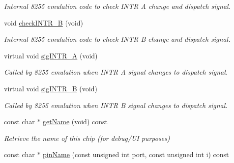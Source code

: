 \begin{DoxyCompactItemize}
\begin{DoxyCompactList}\small\item\em Internal 8255 emulation code to check I\-N\-T\-R A change and dispatch signal. \end{DoxyCompactList}\item 
\hypertarget{classIntel8255_aa1fb90bb0a5ecf6121e8f79eb7b757d8}{void \hyperlink{classIntel8255_aa1fb90bb0a5ecf6121e8f79eb7b757d8}{check\-I\-N\-T\-R\-\_\-\-B} (void)}\label{classIntel8255_aa1fb90bb0a5ecf6121e8f79eb7b757d8}

\begin{DoxyCompactList}\small\item\em Internal 8255 emulation code to check I\-N\-T\-R B change and dispatch signal. \end{DoxyCompactList}\item 
\hypertarget{classIntel8255_a2338b0324884d4362c516631dd838466}{virtual void \hyperlink{classIntel8255_a2338b0324884d4362c516631dd838466}{sig\-I\-N\-T\-R\-\_\-\-A} (void)}\label{classIntel8255_a2338b0324884d4362c516631dd838466}

\begin{DoxyCompactList}\small\item\em Called by 8255 emulation when I\-N\-T\-R A signal changes to dispatch signal. \end{DoxyCompactList}\item 
\hypertarget{classIntel8255_a6d81c4a61f0cc7033e1da1a16cc2275e}{virtual void \hyperlink{classIntel8255_a6d81c4a61f0cc7033e1da1a16cc2275e}{sig\-I\-N\-T\-R\-\_\-\-B} (void)}\label{classIntel8255_a6d81c4a61f0cc7033e1da1a16cc2275e}

\begin{DoxyCompactList}\small\item\em Called by 8255 emulation when I\-N\-T\-R B signal changes to dispatch signal. \end{DoxyCompactList}\item 
\hypertarget{classIntel8255_a74f2c86ed0256d9d51ee468bc156b004}{const char $\ast$ \hyperlink{classIntel8255_a74f2c86ed0256d9d51ee468bc156b004}{get\-Name} (void) const }\label{classIntel8255_a74f2c86ed0256d9d51ee468bc156b004}

\begin{DoxyCompactList}\small\item\em Retrieve the name of this chip (for debug/\-U\-I purposes) \end{DoxyCompactList}\item 
\hypertarget{classIntel8255_ab229c3b40dbb7fdf4304b82cd40696fa}{const char $\ast$ \hyperlink{classIntel8255_ab229c3b40dbb7fdf4304b82cd40696fa}{pin\-Name} (const unsigned int port, const unsigned int i) const }\label{classIntel8255_ab229c3b40dbb7fdf4304b82cd40696fa}


\end{DoxyCompactItemize}
